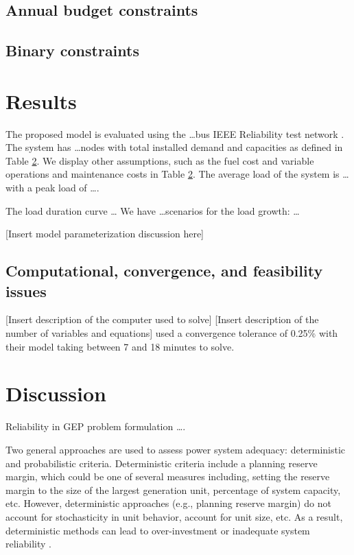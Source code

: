 \documentclass[10pt]{amsart}
\begin{document}
\subsection{Annual budget constraints}
\subsection{Binary constraints}

\section{Results}
The proposed model is evaluated using the \ldots bus IEEE Reliability test network \parencite{}.
The system has \ldots nodes with total installed demand and capacities as defined in Table \ref{}. 
We display other assumptions, such as the fuel cost and variable operations and maintenance costs in Table \ref{}.
The average load of the system is \ldots with a peak load of \ldots.

The load duration curve \ldots
We have \ldots scenarios for the load growth: \ldots 

[Insert model parameterization discussion here]


\subsection{Computational, convergence, and feasibility issues}
[Insert description of the computer used to solve]
[Insert description of the number of variables and equations]
\cite{bakirtzis} used a convergence tolerance of 0.25\% with their model taking between 7 and 18 minutes to solve. 
\section{Discussion}

Reliability in GEP problem formulation \ldots \parencite{hemmati:2013ab}. 

Two general approaches are used to assess power system adequacy: deterministic and probabilistic criteria. 
Deterministic criteria include a planning reserve margin, which could be one of several measures including, setting the reserve margin to the size of the largest generation unit, percentage of system capacity, etc. 
However, deterministic approaches (e.g., planning reserve margin) do not account for stochasticity in unit behavior, account for unit size, etc.
As a result, deterministic methods can lead to over-investment or inadequate system reliability \parencite{aghaei:2013aa}.
\end{document}
